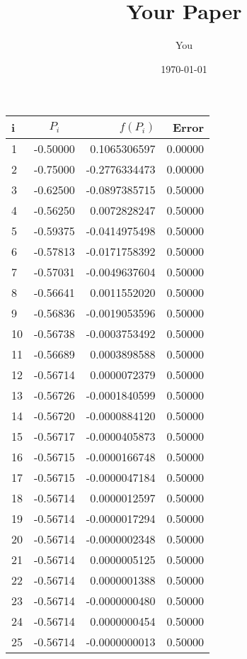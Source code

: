 \documentclass[a4paper]{article}
\title{Your Paper}
\author{You}
\date{\today}
\begin{document}
\maketitle

\begin{tabular}{l | c | r | r}
i & $P_{i}$ & $f(P_{i})$ & Error \\
\hline
1 & -0.50000 & 0.1065306597 & 0.00000 \\ 
2 & -0.75000 & -0.2776334473 & 0.00000 \\ 
3 & -0.62500 & -0.0897385715 & 0.50000 \\ 
4 & -0.56250 & 0.0072828247 & 0.50000 \\ 
5 & -0.59375 & -0.0414975498 & 0.50000 \\ 
6 & -0.57813 & -0.0171758392 & 0.50000 \\ 
7 & -0.57031 & -0.0049637604 & 0.50000 \\ 
8 & -0.56641 & 0.0011552020 & 0.50000 \\ 
9 & -0.56836 & -0.0019053596 & 0.50000 \\ 
10 & -0.56738 & -0.0003753492 & 0.50000 \\ 
11 & -0.56689 & 0.0003898588 & 0.50000 \\ 
12 & -0.56714 & 0.0000072379 & 0.50000 \\ 
13 & -0.56726 & -0.0001840599 & 0.50000 \\ 
14 & -0.56720 & -0.0000884120 & 0.50000 \\ 
15 & -0.56717 & -0.0000405873 & 0.50000 \\ 
16 & -0.56715 & -0.0000166748 & 0.50000 \\ 
17 & -0.56715 & -0.0000047184 & 0.50000 \\ 
18 & -0.56714 & 0.0000012597 & 0.50000 \\ 
19 & -0.56714 & -0.0000017294 & 0.50000 \\ 
20 & -0.56714 & -0.0000002348 & 0.50000 \\ 
21 & -0.56714 & 0.0000005125 & 0.50000 \\ 
22 & -0.56714 & 0.0000001388 & 0.50000 \\ 
23 & -0.56714 & -0.0000000480 & 0.50000 \\ 
24 & -0.56714 & 0.0000000454 & 0.50000 \\ 
25 & -0.56714 & -0.0000000013 & 0.50000 \\
\hline
\end{tabular}


\end{document}
